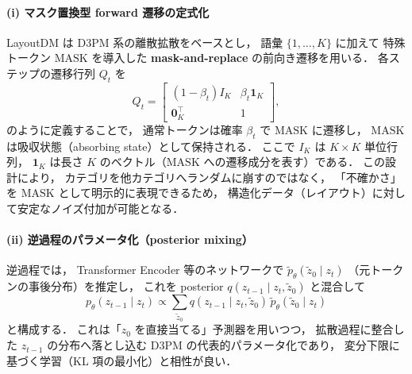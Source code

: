 \documentclass[a4j,12pt,dvipdfmx]{jsreport}
\begin{document}
\paragraph{(i) マスク置換型 forward 遷移の定式化}
LayoutDM は D3PM 系の離散拡散をベースとし，
語彙 $\{1,\dots,K\}$ に加えて
特殊トークン $\mathrm{MASK}$ を導入した
\textbf{mask-and-replace} の前向き遷移を用いる．
各ステップの遷移行列 $Q_t$ を
\begin{equation}
   Q_t
   =
   \begin{bmatrix}
      (1-\beta_t)I_K    & \beta_t\mathbf{1}_K \\
      \mathbf{0}_K^\top & 1
   \end{bmatrix},
   \label{eq:layoutdm_mask_replace}
\end{equation}
のように定義することで，
通常トークンは確率 $\beta_t$ で $\mathrm{MASK}$ に遷移し，
$\mathrm{MASK}$ は吸収状態（absorbing state）として保持される．
ここで $I_K$ は $K\times K$ 単位行列，
$\mathbf{1}_K$ は長さ $K$ のベクトル（$\mathrm{MASK}$ への遷移成分を表す）である．
この設計により，
カテゴリを他カテゴリへランダムに崩すのではなく，
「不確かさ」を $\mathrm{MASK}$ として明示的に表現できるため，
構造化データ（レイアウト）に対して安定なノイズ付加が可能となる．

\paragraph{(ii) 逆過程のパラメータ化（posterior mixing）}
逆過程では，
Transformer Encoder 等のネットワークで
$\tilde{p}_\theta(\tilde{z}_0\mid z_t)$
（元トークンの事後分布）を推定し，
これを posterior $q(z_{t-1}\mid z_t,\tilde{z}_0)$ と混合して
\begin{equation}
   p_\theta(z_{t-1}\mid z_t)
   \propto
   \sum_{\tilde{z}_0}
   q(z_{t-1}\mid z_t,\tilde{z}_0)\,
   \tilde{p}_\theta(\tilde{z}_0\mid z_t)
   \label{eq:layoutdm_posterior_mixing}
\end{equation}
と構成する．
これは「$z_0$ を直接当てる」予測器を用いつつ，
拡散過程に整合した $z_{t-1}$ の分布へ落とし込む
D3PM の代表的パラメータ化であり，
変分下限に基づく学習（KL 項の最小化）と相性が良い．
\end{document}

